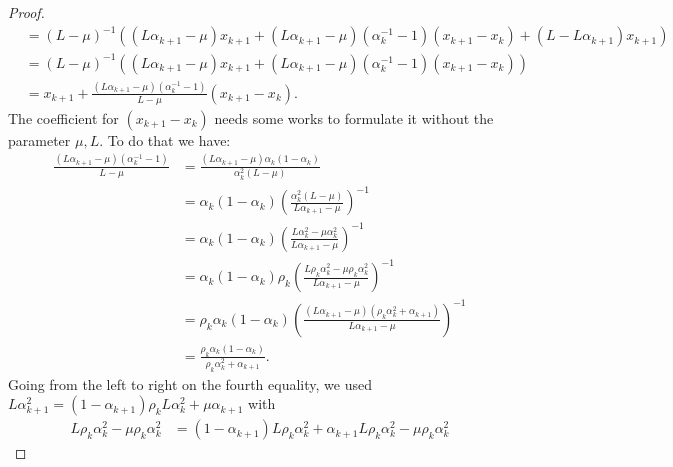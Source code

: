 \documentclass[12pt]{article}
\begin{document}
\begin{proof}
{\begin{align*}
            &= (L - \mu)^{-1}
            \left(
                (L\alpha_{k + 1} - \mu)x_{k + 1} + 
                (L\alpha_{k + 1} - \mu)(\alpha_k^{-1} - 1)(x_{k + 1} - x_k)
                + (L - L \alpha_{k + 1})x_{k + 1}
            \right)
            \\
            &= 
            (L - \mu)^{-1}
            \left(
                (L\alpha_{k + 1} - \mu)x_{k + 1} + (L\alpha_{k + 1} - \mu)(\alpha_k^{-1} - 1)(x_{k + 1} - x_k)
            \right)
            \\
            &= x_{k + 1} + \frac{(L\alpha_{k + 1} - \mu)(\alpha_k^{-1} - 1)}{L - \mu}(x_{k + 1} - x_k). 
        \end{align*}
        }
        The coefficient for $(x_{k + 1} - x_k)$ needs some works to formulate it without the parameter $\mu, L$. 
        To do that we have: 
        \begin{align*}
            \frac{(L\alpha_{k + 1} - \mu)(\alpha_k^{-1} - 1)}{L - \mu}
            &= \frac{(L\alpha_{k + 1} - \mu)\alpha_k(1 - \alpha_k)}{\alpha_k^2(L - \mu)}
            \\
            &= 
            \alpha_k(1 - \alpha_k)
            \left(
                \frac{\alpha_k^2(L - \mu)}{L\alpha_{k + 1} - \mu}
            \right)^{-1}
            \\
            &= \alpha_k(1 - \alpha_k)
            \left(
                \frac{L\alpha_k^2 - \mu\alpha_k^2}{L\alpha_{k + 1} - \mu}
            \right)^{-1}
            \\
            &= 
            \alpha_k(1 - \alpha_k)
            \rho_k\left(
                \frac{L\rho_k\alpha_k^2 - \mu\rho_k\alpha_k^2}{L\alpha_{k + 1} - \mu}
            \right)^{-1}
            \\
            &= 
            \rho_k\alpha_k(1 - \alpha_k)
            \left(
                \frac{(L\alpha_{k + 1} - \mu)(\rho_k\alpha_k^2 + \alpha_{k + 1})}
                {L\alpha_{k + 1} - \mu}
            \right)^{-1}
            \\
            &= \frac{\rho_k\alpha_k(1 - \alpha_k)}{\rho_k\alpha_k^2 + \alpha_{k + 1}}.
        \end{align*}
        Going from the left to right on the fourth equality, we used $L\alpha_{k + 1}^2 = (1 - \alpha_{k + 1})\rho_kL\alpha_k^2 + \mu \alpha_{k + 1}$ with 
        \begin{align*}
            L \rho_k \alpha_k^2 - \mu \rho_k \alpha_k^2 
            &= 
            (1 - \alpha_{k + 1})L \rho_k \alpha_k^2 + \alpha_{k + 1} L \rho_k \alpha_k^2 - \mu \rho_k \alpha_k^2

\end{align*}
\end{proof}
\end{document}
